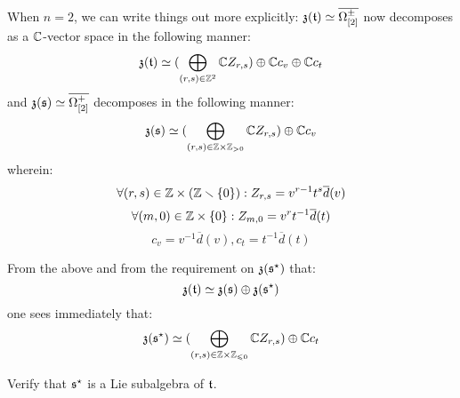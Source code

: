 \begin{remark}
                When $n = 2$, we can write things out more explicitly: $\mathfrak{z}(\mathfrak{t}) \simeq \overline{\Omega_{[2]}^{\pm}}$ now decomposes as a $\mathbb{C}$-vector space in the following manner:
                    $$\mathfrak{z}(\mathfrak{t}) \simeq ( \bigoplus_{(r, s) \in \mathbb{Z}^2} \mathbb{C} Z_{r, s}) \oplus \mathbb{C} c_v \oplus \mathbb{C} c_t$$
                and $\mathfrak{z}(\mathfrak{s}) \simeq \overline{\Omega_{[2]}^+}$ decomposes in the following manner:
                    $$\z(\s) \cong ( \bigoplus_{(r, s) \in \Z \x \Z_{> 0}} \bbC Z_{r, s}) \oplus \bbC c_v$$
                wherein:
                    $$\forall (r, s) \in \Z \x (\Z \setminus \{0\}): Z_{r, s} = v^{r - 1} t^s \overline{d}(v)$$
                    $$\forall (m, 0) \in \Z \x \{0\}: Z_{m, 0} = v^r t^{-1} \overline{d}(t)$$
                    $$c_v = v^{-1} \overline{d}(v), c_t = t^{-1} \overline{d}(t)$$

                From the above and from the requirement on $\mathfrak{z}(\mathfrak{s}^{\star})$ that:
                    $$\mathfrak{z}(\mathfrak{t}) \simeq \mathfrak{z}(\mathfrak{s}) \oplus \mathfrak{z}(\mathfrak{s}^{\star})$$
                one sees immediately that:
                    $$\z(\s^{\star}) \cong ( \bigoplus_{(r, s) \in \Z \x \Z_{\leq 0}} \bbC Z_{r, s}) \oplus \bbC c_t$$
            \end{remark}
            \begin{question} \label{question: toroidal_dual}
                Verify that $\mathfrak{s}^{\star}$ is a Lie subalgebra of $\mathfrak{t}$.
            \end{question}
